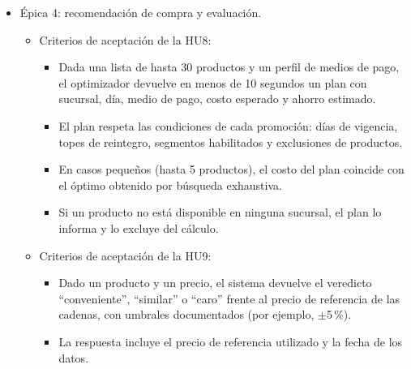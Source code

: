 \documentclass[
11pt, %
]{charter}
\begin{document}
\begin{itemize}
\begin{itemize}
\begin{itemize}
		\end{itemize}
		\item Criterios de aceptación de la HU7:
		\begin{itemize}
			\item El precio de referencia de cada oferta se calcula como el mínimo de los 30 días previos, según el criterio de la Directiva Ómnibus.
			\item Se detectan los tres casos definidos: inflado previo del precio, precio anterior inexistente y descuento efectivo menor al anunciado, con una tolerancia documentada.
			\item Cada alerta incluye una explicación con los precios y las fechas que la justifican.
			\item Sobre un conjunto de al menos 100 ofertas etiquetadas manualmente, la precisión de las alertas es de al menos 0,80.
		\end{itemize}
	\end{itemize}
	\item Épica 4: recomendación de compra y evaluación.
	\begin{itemize}
		\item Criterios de aceptación de la HU8:
		\begin{itemize}
			\item Dada una lista de hasta 30 productos y un perfil de medios de pago, el optimizador devuelve en menos de 10 segundos un plan con sucursal, día, medio de pago, costo esperado y ahorro estimado.
			\item El plan respeta las condiciones de cada promoción: días de vigencia, topes de reintegro, segmentos habilitados y exclusiones de productos.
			\item En casos pequeños (hasta 5 productos), el costo del plan coincide con el óptimo obtenido por búsqueda exhaustiva.
			\item Si un producto no está disponible en ninguna sucursal, el plan lo informa y lo excluye del cálculo.
		\end{itemize}
		\item Criterios de aceptación de la HU9:
		\begin{itemize}
			\item Dado un producto y un precio, el sistema devuelve el veredicto ``conveniente'', ``similar'' o ``caro'' frente al precio de referencia de las cadenas, con umbrales documentados (por ejemplo, $\pm$5\,\%).
			\item La respuesta incluye el precio de referencia utilizado y la fecha de los datos.

\end{itemize}
\end{itemize}
\end{itemize}
\end{document}
